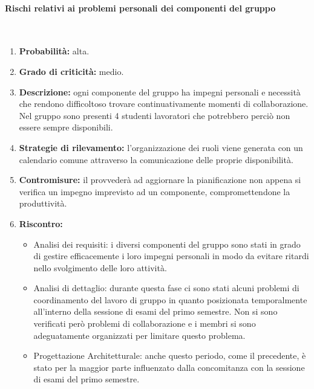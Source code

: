 \paragraph{Rischi relativi ai problemi personali dei componenti del gruppo}\mbox{}\\
\begin{enumerate}
	\item \textbf{Probabilità:} alta.
	\item \textbf{Grado di criticità:} medio.
	\item \textbf{Descrizione:} ogni componente del gruppo ha impegni personali e necessità che rendono difficoltoso trovare continuativamente momenti di collaborazione. Nel gruppo sono presenti 4 studenti lavoratori che potrebbero perciò non essere sempre disponibili.
	\item \textbf{Strategie di rilevamento:} l’organizzazione dei ruoli viene generata con un calendario comune attraverso la comunicazione delle proprie disponibilità.
	\item \textbf{Contromisure:} il \Responsabile{} provvederà ad aggiornare la pianificazione non appena si verifica un impegno imprevisto ad un componente, compromettendone la produttività.
	\item \textbf{Riscontro:}
	\begin{itemize}
		\item Analisi dei requisiti: i diversi componenti del gruppo sono stati in grado di gestire efficacemente i loro impegni personali in modo da evitare ritardi nello svolgimento delle loro attività.
		\item Analisi di dettaglio: durante questa fase ci sono stati alcuni problemi di coordinamento del lavoro di gruppo in quanto posizionata temporalmente all’interno della sessione di esami del primo semestre. Non si sono verificati però problemi di collaborazione e i membri si sono adeguatamente organizzati per limitare questo problema.
		\item Progettazione Architetturale: anche questo periodo, come il precedente, è stato per la maggior parte influenzato dalla concomitanza con la sessione di esami del primo semestre.
	\end{itemize}
\end{enumerate}

